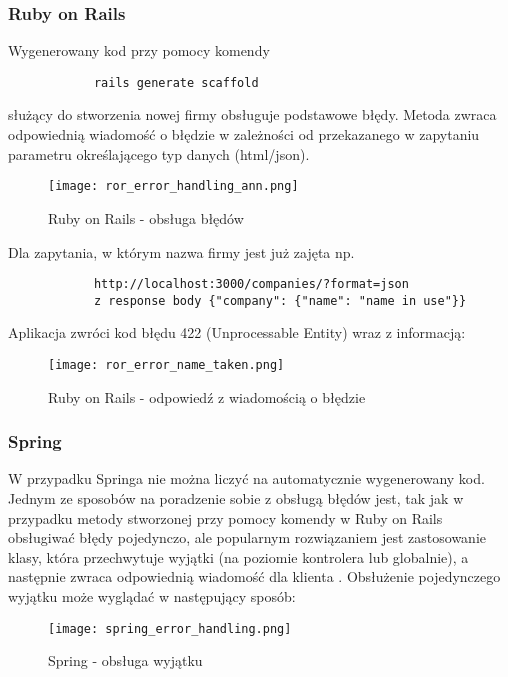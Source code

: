 		\subsubsection{Ruby on Rails}
		Wygenerowany kod przy pomocy komendy
		\begin{verbatim}
			rails generate scaffold 
		\end{verbatim} 
		służący do stworzenia nowej firmy obsługuje podstawowe błędy. Metoda zwraca odpowiednią wiadomość o błędzie w zależności od przekazanego w zapytaniu parametru określającego typ danych (html/json).

		\begin{figure}[H]
			\begin{center}
				\texttt{[image: ror\_error\_handling\_ann.png]}
				\caption{\label{fig:ror-create-company-error} Ruby on Rails - obsługa błędów}
			\end{center}
		\end{figure}
	
		Dla zapytania, w którym nazwa firmy jest już zajęta np.
		\begin{verbatim}
			http://localhost:3000/companies/?format=json 
			z response body {"company": {"name": "name in use"}}
		\end{verbatim}
		Aplikacja zwróci kod błędu 422 (Unprocessable Entity) wraz z informacją:
		\begin{figure}[H]
			\begin{center}
				\texttt{[image: ror\_error\_name\_taken.png]}
				\caption{\label{fig:ror-error-name} Ruby on Rails - odpowiedź z wiadomością o błędzie }
			\end{center}
		\end{figure}

		
		\subsubsection{Spring}
		W przypadku Springa nie można liczyć na automatycznie wygenerowany kod. Jednym ze sposobów na poradzenie sobie z obsługą błędów jest, tak jak w przypadku metody stworzonej przy pomocy komendy w Ruby on Rails obsługiwać błędy pojedynczo, ale popularnym rozwiązaniem jest zastosowanie klasy, która przechwytuje wyjątki (na poziomie kontrolera lub globalnie), a następnie zwraca odpowiednią wiadomość dla klienta \cite{SpringDocs}.
		Obsłużenie pojedynczego wyjątku może wyglądać w następujący sposób:
		\begin{figure}[H]
			\begin{center}
				\texttt{[image: spring\_error\_handling.png]}
				\caption{\label{fig:spring-error-handling} Spring - obsługa wyjątku}
			\end{center}
		\end{figure}
	
